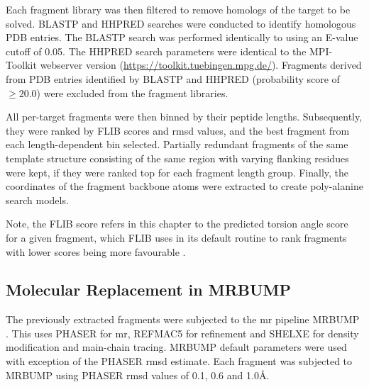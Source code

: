 Each fragment library was then filtered to remove homologs of the target to be solved. BLASTP \cite{Altschul1990-og,Camacho2009-th} and HHPRED \cite{Soding2005-sx} searches were conducted to identify homologous PDB entries. The BLASTP search was performed identically to \textcite{De_Oliveira2015-kb} using an E-value cutoff of 0.05. The HHPRED search parameters were identical to the MPI-Toolkit \cite{Biegert2006-cb} webserver version (\url{https://toolkit.tuebingen.mpg.de/}). Fragments derived from PDB entries identified by BLASTP and HHPRED (probability score of $\geq20.0$) were excluded from the fragment libraries.

All per-target fragments were then binned by their peptide lengths. Subsequently, they were ranked by FLIB scores and \gls{rmsd} values, and the best fragment from each length-dependent bin selected. Partially redundant fragments of the same template structure consisting of the same region with varying flanking residues were kept, if they were ranked top for each fragment length group. Finally, the coordinates of the fragment backbone atoms were extracted to create poly-alanine search models.

Note, the FLIB score refers in this chapter to the predicted torsion angle score for a given fragment, which FLIB uses in its default routine to rank fragments with lower scores being more favourable \cite{De_Oliveira2015-kb}. 

\subsection{Molecular Replacement in MRBUMP}
The previously extracted fragments were subjected to the \gls{mr} pipeline MRBUMP \cite{Keegan2018-kn}. This uses PHASER \cite{McCoy2007-mp} for \gls{mr}, REFMAC5 \cite{Murshudov2011-ww} for refinement and SHELXE \cite{Thorn2013-le} for density modification and main-chain tracing. MRBUMP default parameters were used with exception of the PHASER \gls{rmsd} estimate. Each fragment was subjected to MRBUMP using PHASER \gls{rmsd} values of 0.1, 0.6 and 1.0\AA.

